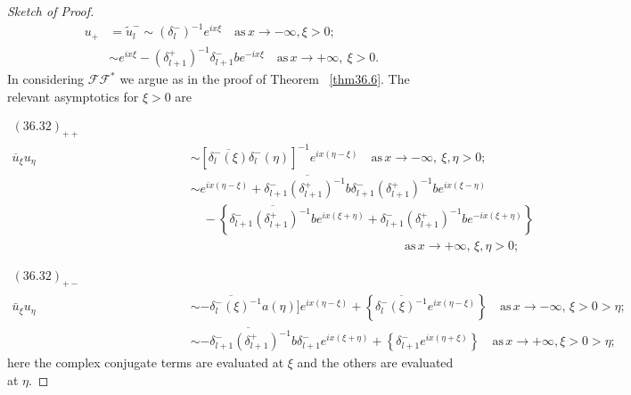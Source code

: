 \documentclass{surv-l}
\theoremstyle{plain}
\theoremstyle{definition}
\numberwithin{equation}{chapter}
\begin{document}
\begin{proof}[Sketch of Proof]
\begin{align}\label{eq36.31}
u_{+}&=\tilde{u}_{l}^-\sim(\delta_{l}^{-})^{-1}e^{ix\xi}\quad \mathrm{as}\,x\rightarrow-\infty,\xi>0;\\
&\sim e^{ix\xi}-(\delta_{l+1}^{+})^{-1}\delta_{l+1}^{-}be^{-ix\xi}\quad \mathrm{as}\,x\rightarrow +\infty,\ \xi>0.\nonumber
\end{align}
In considering $\mathscr{F}\!\!\mathscr{F}^{*}$ we argue as in the proof of Theorem ~\ref{thm36.6}. The relevant asymptotics for $\xi>0$ are

\begin{align*}
(36.32)_{++}\qquad\qquad\qquad\qquad\\
\overline{u}_{\xi}u_{\eta}&\sim[\overline{\delta_{l}^{-}(\xi)}\delta_{l}^{-}(\eta)]^{-1}e^{ix(\eta-\xi)}\quad\mathrm{as}\, x\rightarrow -\infty,\ \xi,\eta>0;\\ \nonumber
&\sim e^{ix(\eta-\xi)}+\overline{\delta_{l+1}^{-}(\delta_{l+1}^{+})^{-1}b}\delta_{l+1}^{-}(\delta_{l+1}^{+})^{-1}be^{ix(\xi-\eta)}\\\nonumber
&\quad-\left\{\overline{\delta_{l+1}^{-}(\delta_{l+1}^{+})^{-1}b}e^{ix(\xi+\eta)}+\delta_{l+1}^{-}(\delta_{l+1}^{+})^{-1}be^{-ix(\xi+\eta)}\right\}\\\nonumber
&\qquad\qquad\qquad\qquad\qquad\qquad\qquad\qquad\quad\,\mathrm{as}\,x\rightarrow +\infty,\,\xi,\eta>0;
\end{align*}

\begin{align*}
(36.32)_{+-}\qquad\qquad\qquad\qquad\\
\bar{u}_{\xi}u_{\eta}&\sim\overline{-\delta_{l}^{-}(\xi)^{-1}}a(\eta)]e^{ix(\eta-\xi)}+\left\{\overline{\delta_{l}^{-}(\xi)^{-1}}e^{ix(\eta-\xi)}\right\} \quad \mathrm{as}\,x\rightarrow-\infty,\,\xi>0>\eta;\\ &\sim\overline{-\delta_{l+1}^{-}(\delta_{l+1}^{+})^{-1}b}\delta_{l+1}^{-}e^{i x(\xi+\eta)}+\left\{\delta_{l+1}^{-}e^{ix(\eta+\xi)}\right\}\quad \mathrm{as}\,x\rightarrow +\infty,\xi>0>\eta;\nonumber
\end{align*}
here the complex conjugate terms are evaluated at $\xi$ and the others are evaluated at $\eta$.


\end{proof}
\end{document}
